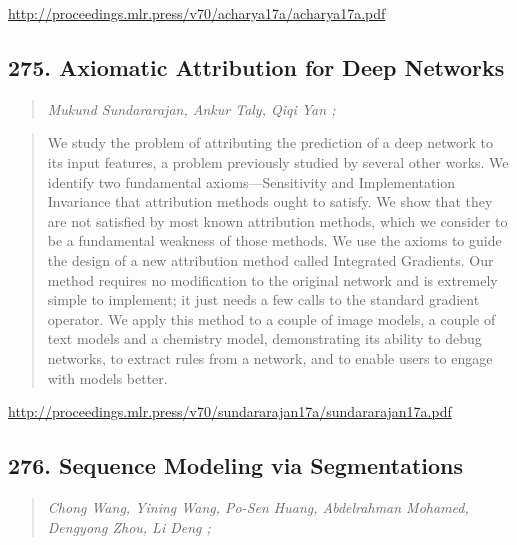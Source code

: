 \documentclass{article}
\begin{document}
\href{http://proceedings.mlr.press/v70/acharya17a/acharya17a.pdf}{http://proceedings.mlr.press/v70/acharya17a/acharya17a.pdf}

\subsection{275. Axiomatic Attribution for Deep Networks}

\begin{quote}
\footnotesize{\textit{Mukund Sundararajan, Ankur Taly, Qiqi Yan ;}}

\end{quote}

\begin{quote}
    We study the problem of attributing the prediction of a deep network to its input features, a problem previously studied by several other works. We identify two fundamental axioms—Sensitivity and Implementation Invariance that attribution methods ought to satisfy. We show that they are not satisfied by most known attribution methods, which we consider to be a fundamental weakness of those methods. We use the axioms to guide the design of a new attribution method called Integrated Gradients. Our method requires no modification to the original network and is extremely simple to implement; it just needs a few calls to the standard gradient operator. We apply this method to a couple of image models, a couple of text models and a chemistry model, demonstrating its ability to debug networks, to extract rules from a network, and to enable users to engage with models better.  
\end{quote}

\href{http://proceedings.mlr.press/v70/sundararajan17a/sundararajan17a.pdf}{http://proceedings.mlr.press/v70/sundararajan17a/sundararajan17a.pdf}

\subsection{276. Sequence Modeling via Segmentations}

\begin{quote}
\footnotesize{\textit{Chong Wang, Yining Wang, Po-Sen Huang, Abdelrahman Mohamed, Dengyong Zhou, Li Deng ;}}

\end{quote}
\end{document}
